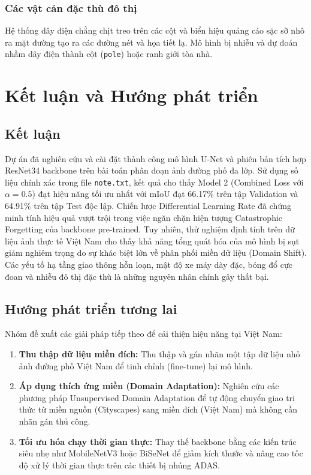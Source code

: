 \documentclass[a4paper,12pt]{report}
\begin{document}
\subsection{Các vật cản đặc thù đô thị}
Hệ thống dây điện chằng chịt treo trên các cột và biển hiệu quảng cáo sặc sỡ nhô ra mặt đường tạo ra các đường nét và họa tiết lạ. Mô hình bị nhiễu và dự đoán nhầm dây điện thành cột (\texttt{pole}) hoặc ranh giới tòa nhà.

\newpage

\chapter{Kết luận và Hướng phát triển}
\section{Kết luận}
Dự án đã nghiên cứu và cài đặt thành công mô hình U-Net và phiên bản tích hợp ResNet34 backbone trên bài toán phân đoạn ảnh đường phố đa lớp. Sử dụng số liệu chính xác trong file \texttt{note.txt}, kết quả cho thấy Model 2 (Combined Loss với $\alpha=0.5$) đạt hiệu năng tối ưu nhất với mIoU đạt 66.17\% trên tập Validation và 64.91\% trên tập Test độc lập. Chiến lược Differential Learning Rate đã chứng minh tính hiệu quả vượt trội trong việc ngăn chặn hiện tượng Catastrophic Forgetting của backbone pre-trained.
Tuy nhiên, thử nghiệm định tính trên dữ liệu ảnh thực tế Việt Nam cho thấy khả năng tổng quát hóa của mô hình bị sụt giảm nghiêm trọng do sự khác biệt lớn về phân phối miền dữ liệu (Domain Shift). Các yếu tố hạ tầng giao thông hỗn loạn, mật độ xe máy dày đặc, bóng đổ cực đoan và nhiễu đô thị đặc thù là những nguyên nhân chính gây thất bại.

\section{Hướng phát triển tương lai}
Nhóm đề xuất các giải pháp tiếp theo để cải thiện hiệu năng tại Việt Nam:
\begin{enumerate}
    \item \textbf{Thu thập dữ liệu miền đích:} Thu thập và gán nhãn một tập dữ liệu nhỏ ảnh đường phố Việt Nam để tinh chỉnh (fine-tune) lại mô hình.
    \item \textbf{Áp dụng thích ứng miền (Domain Adaptation):} Nghiên cứu các phương pháp Unsupervised Domain Adaptation để tự động chuyển giao tri thức từ miền nguồn (Cityscapes) sang miền đích (Việt Nam) mà không cần nhãn gán thủ công.
    \item \textbf{Tối ưu hóa chạy thời gian thực:} Thay thế backbone bằng các kiến trúc siêu nhẹ như MobileNetV3 hoặc BiSeNet để giảm kích thước và nâng cao tốc độ xử lý thời gian thực trên các thiết bị nhúng ADAS.
\end{enumerate}
\end{document}
